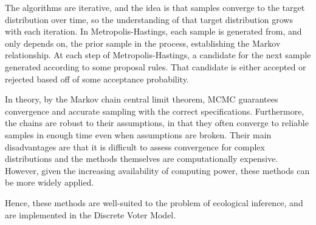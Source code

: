 The algorithms are iterative, and the idea is that samples converge to the target distribution over time, so the understanding of that target distribution grows with each iteration. In Metropolis-Hastings, each sample is generated from, and only depends on, the prior sample in the process, establishing the Markov relationship. At each step of Metropolis-Hastings, a candidate for the next sample generated according to some proposal rules. That candidate is either accepted or rejected based off of some acceptance probability.

In theory, by the Markov chain central limit theorem, MCMC guarantees convergence and accurate sampling with the correct specifications. Furthermore, the chains are robust to their assumptions, in that they often converge to reliable samples in enough time even when assumptions are broken. Their main disadvantages are that it is difficult to assess convergence for complex distributions and the methods themselves are computationally expensive. However, given the increasing availability of computing power, these methods can be more widely applied.

Hence, these methods are well-suited to the problem of ecological inference, and are implemented in the Discrete Voter Model.

